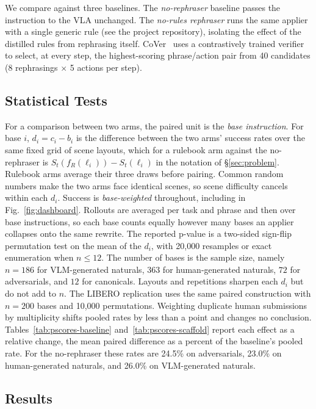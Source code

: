 \documentclass[letterpaper, 10 pt, conference]{ieeeconf} %
\begin{document}
We compare against three baselines. The \emph{no-rephraser} baseline passes the instruction to the VLA unchanged. The \emph{no-rules rephraser} runs the same applier with a single generic rule (see the project repository), isolating the effect of the distilled rules from rephrasing itself. CoVer~\cite{kwok2026scaling} uses a contrastively trained verifier to select, at every step, the highest-scoring phrase/action pair from 40 candidates (8 rephrasings $\times$ 5 actions per step).

\subsection{Statistical Tests}
\label{sec:stats}

For a comparison between two arms, the paired unit is the \emph{base instruction}. For base $i$, $d_i = c_i - b_i$ is the difference between the two arms' success rates over the same fixed grid of scene layouts, which for a rulebook arm against the no-rephraser is $S_t(f_R(\ell_i)) - S_t(\ell_i)$ in the notation of \S\ref{sec:problem}. Rulebook arms average their three draws before pairing. Common random numbers make the two arms face identical
scenes, so scene difficulty cancels within each $d_i$. Success is \emph{base-weighted} throughout, including in Fig.~\ref{fig:dashboard}. Rollouts are averaged per task and phrase and then over base instructions, so each base counts equally however many bases an applier collapses onto the same rewrite. The reported
p-value is a two-sided sign-flip permutation test on the mean of the $d_i$, with 20{,}000 resamples or exact enumeration when $n \le 12$. The number of bases is the sample size, namely $n = 186$ for VLM-generated naturals, $363$ for human-generated naturals, $72$ for adversarials, and $12$ for canonicals. Layouts and repetitions sharpen each $d_i$ but do not add to $n$. The LIBERO replication uses the same paired construction with $n = 200$ bases and 10{,}000 permutations. Weighting
duplicate human submissions by multiplicity shifts pooled rates by less
than a point and changes no conclusion.
Tables~\ref{tab:pscores-baseline} and~\ref{tab:pscores-scaffold} report each effect as a relative change, the mean paired difference as a percent of the baseline's pooled rate. For the no-rephraser these rates are 24.5\% on adversarials, 23.0\% on human-generated naturals, and 26.0\% on VLM-generated naturals.


\subsection{Results}
\end{document}
